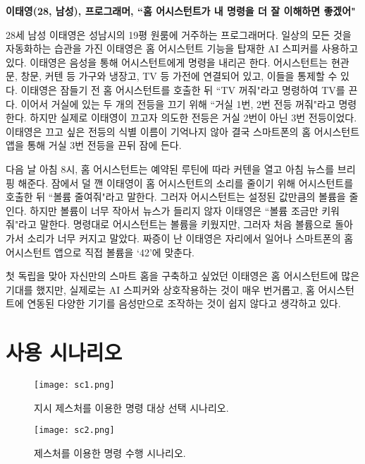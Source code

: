 \textbf{이태영(28, 남성), 프로그래머, ``홈 어시스턴트가 내 명령을 더 잘 이해하면 좋겠어"}

28세 남성 이태영은 성남시의 19평 원룸에 거주하는 프로그래머다. 일상의 모든 것을 자동화하는 습관을 가진 이태영은 홈 어시스턴트 기능을 탑재한 AI 스피커를 사용하고 있다. 이태영은 음성을 통해 어시스턴트에게 명령을 내리곤 한다. 어시스턴트는 현관문, 창문, 커텐 등 가구와 냉장고, TV 등 가전에 연결되어 있고, 이들을 통제할 수 있다. 이태영은 잠들기 전 홈 어시스턴트를 호출한 뒤 ``TV 꺼줘"라고 명령하여 TV를 끈다. 이어서 거실에 있는 두 개의 전등을 끄기 위해 ``거실 1번, 2번 전등 꺼줘"라고 명령한다. 하지만 실제로 이태영이 끄고자 의도한 전등은 거실 2번이 아닌 3번 전등이었다. 이태영은 끄고 싶은 전등의 식별 이름이 기억나지 않아 결국 스마트폰의 홈 어시스턴트 앱을 통해 거실 3번 전등을 끈뒤 잠에 든다.

다음 날 아침 8시, 홈 어시스턴트는 예약된 루틴에 따라 커텐을 열고 아침 뉴스를 브리핑 해준다. 잠에서 덜 깬 이태영이 홈 어시스턴트의 소리를 줄이기 위해 어시스턴트를 호출한 뒤 ``볼륨 줄여줘"라고 말한다. 그러자 어시스턴트는 설정된 값만큼의 볼륨을 줄인다. 하지만 볼륨이 너무 작아서 뉴스가 들리지 않자 이태영은 ``볼륨 조금만 키워줘"라고 말한다. 명령대로 어시스턴트는 볼륨을 키웠지만, 그러자 처음 볼륨으로 돌아가서 소리가 너무 커지고 말았다. 짜증이 난 이태영은 자리에서 일어나 스마트폰의 홈 어시스턴트 앱으로 직접 볼륨을 `42'에 맞춘다.

첫 독립을 맞아 자신만의 스마트 홈을 구축하고 싶었던 이태영은 홈 어시스턴트에 많은 기대를 했지만, 실제로는 AI 스피커와 상호작용하는 것이 매우 번거롭고, 홈 어시스턴트에 연동된 다양한 기기를 음성만으로 조작하는 것이 쉽지 않다고 생각하고 있다.

\section{사용 시나리오}




\vspace{-1mm}
\begin{figure}[h]
  \centering
  \texttt{[image: sc1.png]}
  \caption{지시 제스처를 이용한 명령 대상 선택 시나리오.}
  \label{fig:sc1}
\end{figure}
\vspace{-5mm}
\begin{figure}[h]
  \centering
  \texttt{[image: sc2.png]}
  \caption{제스처를 이용한 명령 수행 시나리오.}
  \label{fig:sc2}
\end{figure}
\vspace{-4mm}

